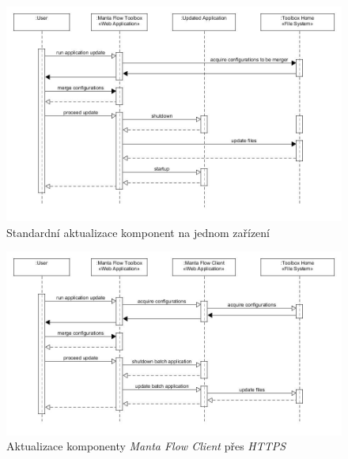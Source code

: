 \documentclass[11pt,twoside,a4paper]{book}
\begin{document}
\begin{figure}
\begin{center}
\includegraphics[width=1\linewidth]{figures/update_server_seq}
\caption{Standardní aktualizace komponent na jednom zařízení}
\label{fig:des-upd_server}
\end{center}
\end{figure}

\begin{figure}
\begin{center}
\includegraphics[width=1\linewidth]{figures/update_client_seq}
\caption{Aktualizace komponenty \textit{Manta Flow Client} přes \textit{HTTPS}}
\label{fig:des-upd_client}
\end{center}
\end{figure}
\end{document}
